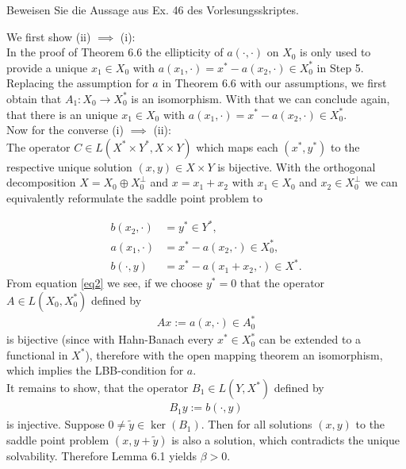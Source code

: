 
\begin{exercise}

Beweisen Sie die Aussage aus Ex. 46 des Vorlesungsskriptes.

\end{exercise}


\begin{solution}

We first show (ii) $\implies$ (i): \\
In the proof of Theorem 6.6 the ellipticity of $a(\cdot,\cdot)$ on $X_0$ is only used
to provide a unique $x_1 \in X_0$ with $a(x_1,\cdot) = x^* - a(x_2,\cdot) \in X_0^*$ in Step 5.
Replacing the assumption for $a$ in Theorem 6.6 with our assumptions, we first
obtain that $A_1: X_0 \to X_0^*$ is an isomorphism.
With that we can conclude again, that there is an unique $x_1 \in X_0$ with $a(x_1,\cdot) = x^* - a(x_2,\cdot) \in X_0^*$. \\
Now for the converse (i) $\implies$ (ii): \\
The operator $C \in L(X^* \times Y^*, X \times Y)$ which maps each $(x^*,y^*)$
to the respective unique solution $(x,y) \in X \times Y$ is bijective.
With the orthogonal decomposition $X = X_0 \oplus X_0^{\bot}$ and $x = x_1 + x_2$
with $x_1 \in X_0$ and $x_2 \in X_0^{\bot}$ we can equivalently reformulate the
saddle point problem to

\begin{align}
  b(x_2,\cdot) &= y^* \in Y^*, \label{eq1}\\
  a(x_1,\cdot) &= x^* - a(x_2,\cdot) \in X_0^*, \label{eq2}\\
  b(\cdot,y) &= x^* - a(x_1 + x_2,\cdot) \in X^*. \label{eq3}
\end{align}
From equation \eqref{eq2} we see, if we choose $y^* = 0$ that the operator $A \in L(X_0,X_0^*)$ defined by
\begin{align*}
  Ax := a(x,\cdot) \in A_0^*
\end{align*}
is bijective (since with Hahn-Banach every $x^* \in X_0^*$ can be extended to a functional in $X^*$), therefore with the open mapping theorem an isomorphism,
which implies the LBB-condition for $a$. \\
It remains to show, that the operator $B_1 \in L(Y,X^*)$ defined by
\begin{align*}
  B_1y := b(\cdot,y)
\end{align*}
is injective. Suppose $0 \neq \tilde{y} \in \ker(B_1)$. Then for all solutions
$(x,y)$ to the saddle point problem $(x,y+\tilde{y})$ is also a solution, which
contradicts the unique solvability. Therefore Lemma 6.1 yields $\beta > 0$.


\end{solution}

